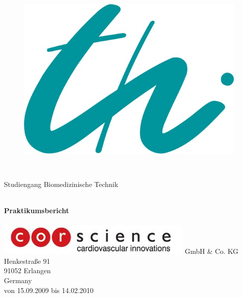 
\begin{titlepage}
 
\begin{center}
 
 
\thispagestyle{empty} ~
{\normalsize{}\fontsize{14}{14}\selectfont

\vspace{-2cm}

\begin{figure}[h!]
\includegraphics[width=0.2\hsize]{logo_gr.jpg}\hfill
\begin{minipage}[b]{0.75\hsize}
{\fontsize{25pt}{20} \selectfont{%
   Technische Universität Ilmenau}}\\[1ex]
{\fontsize{12pt}{10} \selectfont{%
  Fakultät für Informatik und Automatisierung\\
      Institut für Biomedizinische Technik und Informatik\\
    }}
\end{minipage}
\end{figure}

\vspace{20mm}
}

\large{Studiengang Biomedizinische Technik}
 
\HRule \\[0.4cm]
{ \huge \bfseries Praktikumsbericht}\\[0.4cm]
 
\HRule \\[1.5cm]
 
\includegraphics[width=0.2\hsize]{header_logo.jpg} GmbH \& Co. KG \\
Henkestraße 91 \\
91052 Erlangen \\
Germany \\
von 15.09.2009 bis 14.02.2010

\vspace{20mm}


\end{center}
\end{titlepage}
